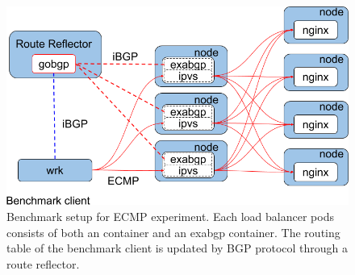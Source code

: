 \begin{figure}[h]
  \centering
  \includegraphics[width=0.9\columnwidth]{Figs/lb_ecmp_schem}

  \par\bigskip
  \centering
  \begin{minipage}{0.9\columnwidth}
    \caption[Benchmark setup for ECMP experiment]{
      Benchmark setup for ECMP experiment.
      Each load balancer pods consists of both an  container and an exabgp container.
      The routing table of the benchmark client is updated by BGP protocol through a route reflector.
    }
    \label{fig:ecmp-benchmark-schem}
  \end{minipage}
\end{figure}

